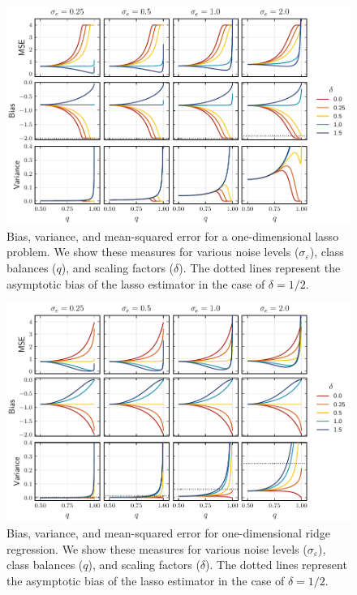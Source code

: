 \begin{figure}[htpb]
  \centering
  \includegraphics[]{plots/binary_onedim_bias_var_lasso.pdf}
  \caption{%
    Bias, variance, and mean-squared error for a one-dimensional lasso problem. We show these measures for various noise levels (\(\sigma_\varepsilon\)), class balances (\(q\)), and scaling factors (\(\delta\)).
    The dotted lines represent the asymptotic bias of the lasso estimator in the case of \(\delta = 1/2\).
  }
  \label{fig:bias-var-onedim-lasso}
\end{figure}

\begin{figure}[htpb]
  \centering
  \includegraphics[]{plots/binary_onedim_bias_var_ridge.pdf}
  \caption{%
    Bias, variance, and mean-squared error for one-dimensional ridge regression. We show these measures for various noise levels (\(\sigma_\varepsilon\)), class balances (\(q\)), and scaling factors (\(\delta\)).
    The dotted lines represent the asymptotic bias of the lasso estimator in the case of \(\delta = 1/2\).
  }
  \label{fig:bias-var-onedim-ridge}
\end{figure}

